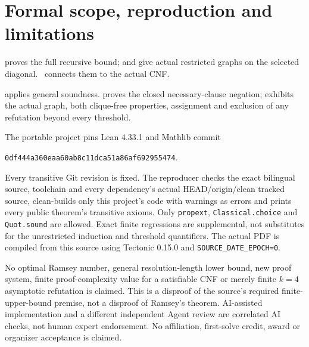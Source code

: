\documentclass[10pt,a4paper]{article}
\begin{document}
\clearpage
\section{Formal scope, reproduction and limitations}
 proves the full recursive bound;
 and  give actual restricted
graphs on the selected diagonal. \, connects them to
the actual CNF.

 applies general soundness.
 proves the closed necessary-clause negation;
 exhibits the actual graph, both clique-free properties,
assignment and exclusion of any refutation beyond every threshold.

The portable project pins Lean 4.33.1 and Mathlib commit
\begin{center}
\texttt{0df444a360eaa60ab8c11dca51a86af692955474}.
\end{center}
Every transitive Git revision is fixed.
The reproducer checks the exact bilingual source, toolchain and every dependency's actual
HEAD/origin/clean tracked source, clean-builds only this project's code with warnings as
errors and prints every public theorem's transitive axioms. Only \texttt{propext},
\texttt{Classical.choice} and \texttt{Quot.sound} are allowed. Exact finite regressions are
supplemental, not substitutes for the unrestricted induction and threshold quantifiers.
The actual PDF is compiled from this source using Tectonic 0.15.0 and
\texttt{SOURCE\_DATE\_EPOCH=0}.

No optimal Ramsey number, general resolution-length lower bound, new proof system, finite
proof-complexity value for a satisfiable CNF or merely finite $k=4$ asymptotic refutation is
claimed. This is a disproof of the source's required finite-upper-bound premise, not a
disproof of Ramsey's theorem. AI-assisted implementation and a different independent
Agent review are correlated AI checks, not human expert endorsement. No affiliation,
first-solve credit, award or organizer acceptance is claimed.
\end{document}
